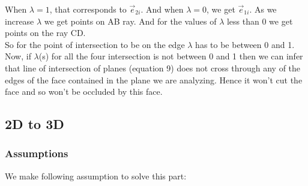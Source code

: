 When $\lambda = 1$, that corresponds to $\vec{e}_{2i}$. And when $\lambda = 0$, we get $\vec{e}_{1i}$. As we increase $\lambda$ we get points on AB ray. And for the values of $\lambda $ less than 0 we get points on the ray CD. \\
So for the point of intersection to be on the edge $\lambda$ has to be between 0 and 1.\\
Now, if $\lambda$(s) for all the four intersection is not between 0 and 1 then we can infer that line of intersection of planes (equation 9) does not cross through any of the edges of the face contained in the plane we are analyzing. Hence it won't cut the face and so won't be occluded by this face. 

\subsection{2D to 3D}
\subsubsection{Assumptions}
We make following assumption to solve this part:

